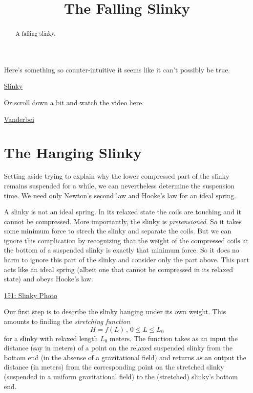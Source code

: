 \documentclass{ximera}
\title{The Falling Slinky}
\begin{document}
\begin{abstract}
A falling slinky.
\end{abstract}
\maketitle

Here's something so counter-intuitive it seems like it can't possibly be true.

\begin{center}  
\end{center}


\href{https://www.youtube.com/watch?v=k5s1cMNTmGs}{Slinky}



Or scroll down a bit and watch the video here.

\href{dsffdhttps://vanderbei.princeton.edu/WebGL/Slinky.html}{Vanderbei}

\section{The Hanging Slinky}

Setting aside trying to explain why the lower compressed part of the slinky remains suspended for a while, we can nevertheless determine the suspension time. We need only Newton's second law and Hooke's law for an ideal spring.

A slinky is not an ideal spring. In its relaxed state the coils are touching and it cannot be compressed. More importantly, the slinky is \emph{pretensioned}. So it takes some minimum force to strech the slinky and separate the coils. But we can ignore this complication by recognizing that the weight of the compressed coils at the bottom of a suspended slinky is exactly that minimum force. So it does no harm to ignore this part of the slinky and consider only the part above. This part acts like an ideal spring (albeit one that cannot be compressed in its relaxed state) and obeys Hooke's law.

\begin{onlineOnly}
    \begin{center}
\end{center}
\end{onlineOnly}

\href{https://www.desmos.com/calculator/zqjjgael5j}{151: Slinky Photo}



Our first step is to describe the slinky hanging under its own weight. This amounts to finding the \emph{stretching function}
\[
   H = f(L) \, , \, 0\leq L \leq L_0 
\]
for a slinky with relaxed length $L_0$ meters. The function takes as an input the distance (say in meters) of a point on the relaxed suspended slinky from the bottom end (in the absense of a gravitational field) and returns as an output the distance (in meters) from the corresponding point on the stretched slinky (suspended in a uniform gravitational field) to the (stretched) slinky's bottom end. 
\end{document}
